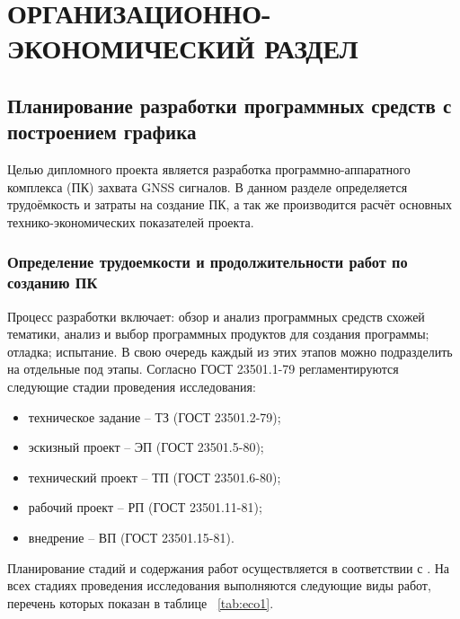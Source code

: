 \section{ОРГАНИЗАЦИОННО-ЭКОНОМИЧЕСКИЙ РАЗДЕЛ}
\subsection{Планирование разработки программных средств с построением графика}
Целью дипломного проекта является разработка программно-аппаратного комплекса (ПК) захвата GNSS сигналов.
В данном разделе определяется трудоёмкость и затраты на создание ПК, а так же производится расчёт основных технико-экономических
показателей проекта.

\subsubsection*{Определение трудоемкости и продолжительности работ по созданию ПК}
Процесс разработки включает: обзор и анализ программных средств схожей тематики, анализ и выбор программных продуктов для
создания программы; отладка; испытание. В свою очередь каждый из этих этапов можно подразделить на отдельные под этапы.
Согласно ГОСТ 23501.1-79 регламентируются следующие стадии проведения исследования:

\begin{itemize}
	\item техническое задание – ТЗ (ГОСТ 23501.2-79);
	\item эскизный проект – ЭП (ГОСТ 23501.5-80);
	\item технический проект – ТП (ГОСТ 23501.6-80);
	\item рабочий проект – РП (ГОСТ 23501.11-81);
	\item внедрение – ВП (ГОСТ 23501.15-81).
\end{itemize}

Планирование стадий и содержания работ осуществляется в соответствии с \cite{bibl51}. На всех стадиях проведения исследования
выполняются следующие виды работ, перечень которых показан в таблице ~\ref{tab:eco1}.

